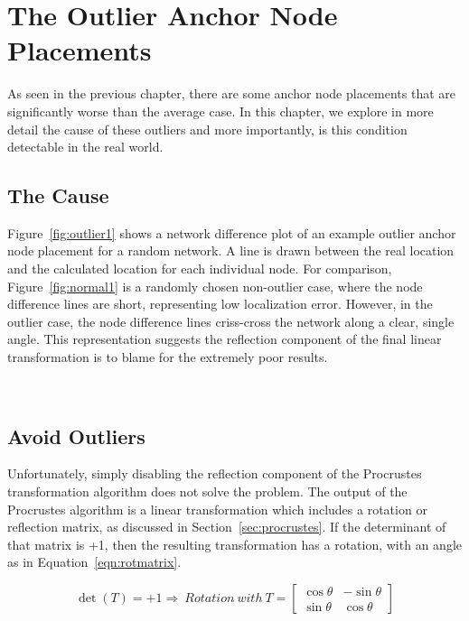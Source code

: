 \chapter{The Outlier Anchor Node Placements}
\label{chap:outliers}
As seen in the previous chapter, there are some anchor node placements that are significantly worse than the average case.   In this chapter, we explore in more detail the cause of these outliers and more importantly, is this condition detectable in the real world.

\section{The Cause}
Figure~\ref{fig:outlier1} shows a network difference plot of an example outlier anchor node placement for a random network. A line is drawn between the real location and the calculated location for each individual node.  For comparison, Figure~\ref{fig:normal1} is a randomly chosen non-outlier case, where the node difference lines are short, representing low localization error.  However, in the outlier case, the node difference lines criss-cross the network along a clear, single angle.  This representation suggests the reflection component of the final linear transformation is to blame for the extremely poor results.

\begin{figure}
  \centering
\\
	\label{fig:outliernetworkdiff}
	\caption{}
\end{figure}

\section{Avoid Outliers}
\label{sec:reflection}
Unfortunately, simply disabling the reflection component of the Procrustes transformation algorithm does not solve the problem.  The output of the Procrustes algorithm is a linear transformation which includes a rotation or reflection matrix, as discussed in Section~\ref{sec:procrustes}.  If the determinant of that matrix is +1, then the resulting transformation has a rotation, with an angle as in Equation~\ref{eqn:rotmatrix}.  

\begin{equation}
	\det{(T)}=+1 \Rightarrow ~Rotation ~with ~T=
	\begin{bmatrix}
	\cos{\theta} & -\sin{\theta} \\ 
	\sin{\theta} & \cos{\theta}\end{bmatrix}
	\label{eqn:rotmatrix} 
\end{equation}


